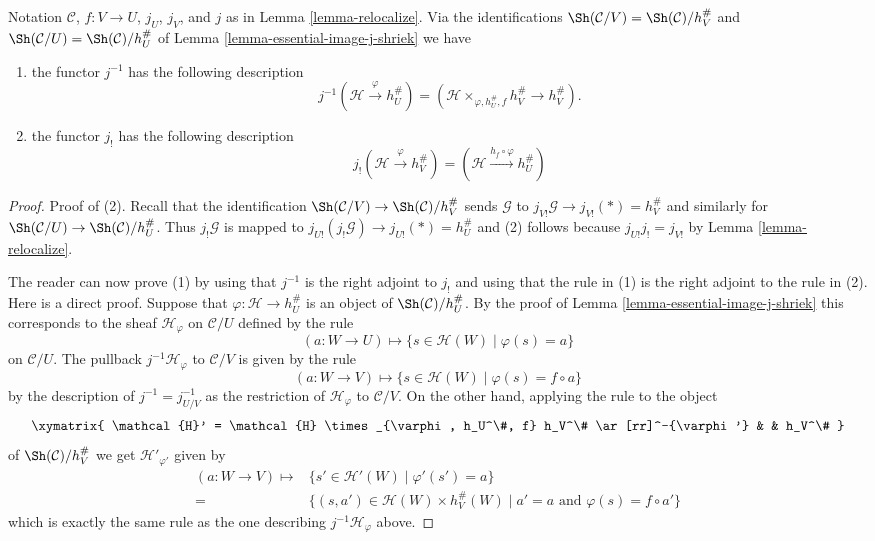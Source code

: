 \begin{lemma}
\label{lemma-relocalize-explicit}
Notation $\mathcal{C}$, $f : V \to U$, $j_U$, $j_V$, and $j$ as in
Lemma \ref{lemma-relocalize}. Via the identifications
$\Sh(\mathcal{C}/V) = \Sh(\mathcal{C})/h_V^\#$
and
$\Sh(\mathcal{C}/U) = \Sh(\mathcal{C})/h_U^\#$
of
Lemma \ref{lemma-essential-image-j-shriek}
we have
\begin{enumerate}
\item the functor $j^{-1}$ has the following description
$$
j^{-1}(\mathcal{H} \xrightarrow{\varphi} h_U^\#)
=
(\mathcal{H} \times_{\varphi, h_U^\#, f} h_V^\# \to h_V^\#).
$$
\item the functor $j_!$ has the following description
$$
j_!(\mathcal{H} \xrightarrow{\varphi} h_V^\#) =
(\mathcal{H} \xrightarrow{h_f \circ \varphi} h_U^\#)
$$
\end{enumerate}
\end{lemma}

\begin{proof}
Proof of (2). Recall that the identification
$\Sh(\mathcal{C}/V) \to \Sh(\mathcal{C})/h_V^\#$
sends $\mathcal{G}$ to $j_{V!}\mathcal{G} \to j_{V!}(*) = h_V^\#$
and similarly for
$\Sh(\mathcal{C}/U) \to \Sh(\mathcal{C})/h_U^\#$.
Thus $j_!\mathcal{G}$ is mapped to
$j_{U!}(j_!\mathcal{G}) \to j_{U!}(*) = h_U^\#$
and (2) follows because $j_{U!}j_! = j_{V!}$
by Lemma \ref{lemma-relocalize}.

\medskip\noindent
The reader can now prove (1) by using that $j^{-1}$ is the
right adjoint to $j_!$ and using that the rule in (1)
is the right adjoint to the rule in (2). Here is a direct proof.
Suppose that $\varphi : \mathcal{H} \to h_U^\#$ is an object of
$\Sh(\mathcal{C})/h_U^\#$. By the proof of
Lemma \ref{lemma-essential-image-j-shriek}
this corresponds to the sheaf
$\mathcal{H}_\varphi$ on $\mathcal{C}/U$ defined by the rule
$$
(a : W \to U)
\longmapsto
\{ s \in \mathcal{H}(W) \mid \varphi(s) = a\}
$$
on $\mathcal{C}/U$. The pullback $j^{-1}\mathcal{H}_\varphi$ to
$\mathcal{C}/V$ is given by the rule
$$
(a : W \to V)
\longmapsto
\{ s \in \mathcal{H}(W) \mid \varphi(s) = f \circ a\}
$$
by the description of $j^{-1} = j_{U/V}^{-1}$ as the restriction
of $\mathcal{H}_\varphi$ to $\mathcal{C}/V$.
On the other hand, applying the rule to the object
$$
\xymatrix{
\mathcal{H}' = \mathcal{H} \times_{\varphi, h_U^\#, f} h_V^\#
\ar[rr]^-{\varphi'} & & h_V^\#
}
$$
of $\Sh(\mathcal{C})/h_V^\#$
we get $\mathcal{H}'_{\varphi'}$
given by
\begin{align*}
(a : W \to V)
\longmapsto
&  \{ s' \in \mathcal{H}'(W) \mid \varphi'(s') = a\} \\
= &
\{ (s, a') \in \mathcal{H}(W) \times h_V^\#(W) \mid
a' = a \text{ and } \varphi(s) = f \circ a'\}
\end{align*}
which is exactly the same rule as the one describing
$j^{-1}\mathcal{H}_\varphi$ above.
\end{proof}

